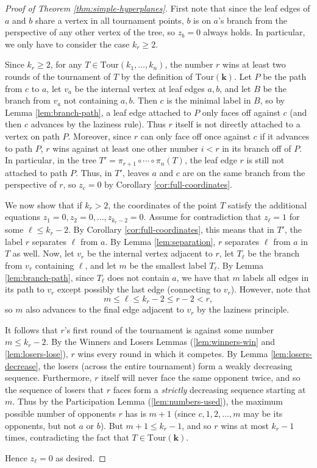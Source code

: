 \documentclass[11pt]{amsart}
\newcommand{\Tour}{\mathrm{Tour}}
\numberwithin{thm}{section}
\numberwithin{equation}{section}
\numberwithin{figure}{section}
\theoremstyle{definition}
\begin{document}
\begin{proof}[Proof of Theorem \ref{thm:simple-hyperplanes}]
  First note that since the leaf edges of $a$ and $b$ share a vertex in all tournament points, $b$ is on $a$'s branch from the perspective of any other vertex of the tree, so $z_b=0$ always holds.  In particular, we only have to consider the case $k_r\ge 2$.
  
  Since $k_r\ge 2$, for any $T\in \Tour(k_1,\ldots,k_n)$, the number $r$ wins at least two rounds of the tournament of $T$ by the definition of $\Tour(\mathbf{k})$.  Let $P$ be the path from $c$ to $a$, let $v_a$ be the internal vertex at leaf edges $a,b$, and let $B$ be the branch from $v_a$ not containing $a,b$.  Then $c$ is the minimal label in $B$, so by Lemma \ref{lem:branch-path}, a leaf edge attached to $P$ only faces off against $c$ (and then $c$ advances by the laziness rule).  Thus $r$ itself is not directly attached to a vertex on path $P$.   Moreover, since $r$ can only face off once against $c$ if it advances to path $P$, $r$ wins against at least one other number $i<r$ in its branch off of $P$. In particular, in the tree $T' = \pi_{r+1} \circ \cdots \circ \pi_n(T)$, the leaf edge $r$ is still not attached to path $P$.  Thus, in $T'$, leaves $a$ and $c$ are on the same branch from the perspective of $r$, so $z_c=0$ by Corollary \ref{cor:full-coordinates}.
  
  We now show that if $k_r>2$, the coordinates of the point $T$ satisfy the additional equations $z_1=0,z_2=0,\ldots,z_{k_r-2}=0$.  Assume for contradiction that $z_\ell = 1$ for some $\ell\le k_r-2$.  By Corollary \ref{cor:full-coordinates}, this means that in $T'$, the label $r$ separates $\ell$ from $a$. By Lemma \ref{lem:separation}, $r$ separates $\ell$ from $a$ in $T$ as well. Now, let $v_r$ be the internal vertex adjacent to $r$, let $T_\ell$ be the branch from $v_r$ containing $\ell$, and let $m$ be the smallest label $T_\ell$. By Lemma \ref{lem:branch-path}, since $T_\ell$ does not contain $a$, we have that $m$ labels all edges in its path to $v_r$ except possibly the last edge (connecting to $v_r$). However, note that 
  \[m\le\ell\le k_r-2\le r-2 < r,\]
  so $m$ also advances to the final edge adjacent to $v_r$ by the laziness principle.
  
  It follows that $r$'s first round of the tournament is against some number $m\le k_r-2$.  By the Winners and Losers Lemmas (\ref{lem:winners-win} and \ref{lem:losers-lose}), $r$ wins every round in which it competes. By Lemma \ref{lem:losers-decrease}, the losers (across the entire tournament) form a weakly decreasing sequence. Furthermore, $r$ itself will never face the same opponent twice, and so the sequence of losers that $r$ faces form a \textit{strictly} decreasing sequence starting at $m$. Thus by the Participation Lemma (\ref{lem:numbers-used}), the maximum possible number of opponents $r$ has is $m+1$ (since $c,1,2,\ldots,m$ may be its opponents, but not $a$ or $b$).  But $m+1\le k_r-1$, and so $r$ wins at most $k_r-1$ times, contradicting the fact that $T \in \Tour(\mathbf{k})$.
  
  Hence $z_\ell=0$ as desired.
\end{proof}



\end{document}
